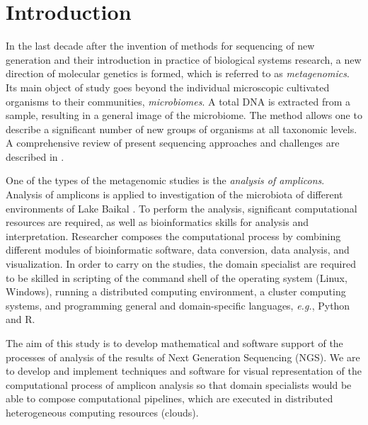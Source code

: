 \documentclass[a4paper]{jpconf}
\begin{document}

\section{Introduction}


In the last decade after the invention of methods for sequencing of new generation and their introduction in practice of biological systems research, a new direction of molecular genetics is formed, which is referred to as \emph{metagenomics}. Its main object of study goes beyond the individual microscopic cultivated organisms to their communities, \emph{microbiomes}. A total DNA is extracted from a sample, resulting in a general image of the microbiome. The method allows one to describe a significant number of new groups of organisms at all taxonomic levels. A comprehensive review of present sequencing approaches and challenges are described in \cite{pere20}.

One of the types of the metagenomic studies is the \emph{analysis of amplicons}. Analysis of amplicons is applied to investigation of the microbiota of different environments of Lake Baikal \cite{underice}. To perform the analysis, significant computational resources are required, as well as bioinformatics skills for analysis and interpretation. Researcher composes the computational process by combining different modules of bioinformatic software, data conversion, data analysis, and visualization. In order to carry on the studies, the domain specialist are required to be skilled in scripting of the command shell of the operating system (Linux, Windows), running a distributed computing environment, a cluster computing systems, and programming general and domain-specific languages, \emph{e.g.}, Python and R.

The aim of this study is to develop mathematical and software support of the processes of analysis of the results of Next Generation Sequencing (NGS). We are to develop and implement techniques and software for visual representation of the computational process of amplicon analysis so that domain specialists would be able to compose computational pipelines, which are executed in distributed heterogeneous computing resources (clouds). %
\end{document}
